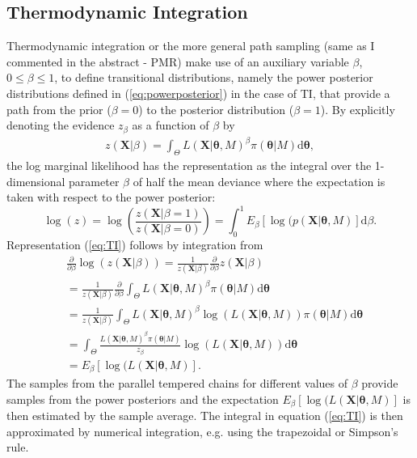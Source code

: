 \documentclass[aps,reprint,amsmath,amssymb,showpacs,showkeys]{revtex4-1}%
\newcommand{\cb}{ \color{blue}}
\begin{document}
\subsection{Thermodynamic Integration}
Thermodynamic integration or the more general path sampling {\cb (same as I commented in the abstract - PMR)} \citep{Gelman:1998} make use of an auxiliary variable $\beta$, $0\leq \beta \leq 1$, to
define transitional distributions, namely the power posterior distributions defined in (\ref{eq:powerposterior}) in the case of TI, that provide a path from the prior ($\beta=0$) to the posterior distribution ($\beta=1$). By explicitly denoting the evidence $z_\beta$ as a function of $\beta$ by
\begin{align}
z(\bm{X}|\beta)=\int_{\Theta} L(\bm{X}|\bm{\theta},M)^{\beta}\pi(\bm{\theta}|M) \text{d}\bm{\theta},
\end{align}
the log marginal likelihood has the representation as the integral over the 1-dimensional parameter $\beta$ of half the mean deviance where the expectation is taken with respect to the power posterior:
\begin{equation}\label{eq:TI}
\log(z)=\log\left( \frac{z(\bm{X}|\beta=1)}{z(\bm{X}|\beta=0)}\right)=\int_0^1 E_{\beta} \left[ \log(p(\bm{X}|\bm{\theta},M)\right]\text{d}\beta.
\end{equation}
Representation (\ref{eq:TI}) follows by integration from
\begin{align*}
&\frac{\partial}{\partial\beta} \log(z(\bm{X}|\beta)) = \frac{1}{z(\bm{X}|\beta)} \frac{\partial}{\partial\beta} z(\bm{X}|\beta)\\
&= \frac{1}{z(\bm{X}|\beta)} \frac{\partial}{\partial\beta}\int_{\Theta} L(\bm{X}|\bm{\theta},M)^{\beta}\pi(\bm{\theta}|M) \text{d}\bm{\theta}\\
&=  \frac{1}{z(\bm{X}|\beta)} \int_{\Theta}  L(\bm{X}|\bm{\theta},M)^{\beta}\log(L(\bm{X}|\bm{\theta},M)) \pi(\bm{\theta}|M) \text{d}\bm{\theta}\\
&=  \int_{\Theta}   \frac{L(\bm{X}|\bm{\theta},M)^{\beta}\pi(\bm{\theta}|M)}{z_{\beta}} \log(L(\bm{X}|\bm{\theta},M))\text{d}\bm{\theta}\\
&= E_{\beta} \left[ \log(L(\bm{X}|\bm{\theta},M)\right].
\end{align*}
The samples from the parallel tempered chains for different values of $\beta$ provide samples from the power posteriors and the
expectation $E_{\beta}\left[ \log(L(\bm{X}|\bm{\theta},M)\right]$ is then estimated by the sample average. The integral
in equation (\ref{eq:TI}) is then approximated by numerical integration, e.g. using the trapezoidal or Simpson's rule.
\end{document}
